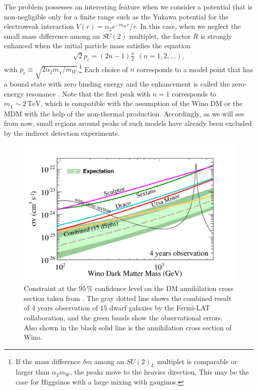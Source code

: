 \documentclass[12pt,twoside,book]{article}
\begin{document}
The problem possesses an interesting feature when we consider a potential that is non-negligible only for a finite range such as the Yukawa potential for the electroweak interaction $V(r) = \alpha_2 e^{-m_W r} / r$.
In this case, when we neglect the small mass difference among an $SU(2)$ multiplet, the factor $R$ is strongly enhanced when the initial particle mass satisfies the equation
\begin{align}
  \sqrt{2} p_c = (2n - 1) \frac{\pi}{2}~~(n = 1, 2, \dots),
\end{align}
with $p_c \equiv \sqrt{2 \alpha_2 m_\chi / m_W}$.\footnote{
  If the mass difference $\delta m$ among an $SU(2)_L$ multiplet is comparable or larger than $\alpha_2 m_W$, the peaks move to the heavier direction.
  This may be the case for Higgsinos with a large mixing with gauginos.
}
Each choice of $n$ corresponds to a model point that has a bound state with zero binding energy and the enhancement is called the zero-energy resonance \cite{Landau1981Quantum}.
Note that the first peak with $n=1$ corresponds to $m_\chi \sim 2\,\mathrm{TeV}$, which is compatible with the assumption of the Wino DM or the MDM with the help of the non-thermal production.
Accordingly, as we will see from now, small regions around peaks of such models have already been excluded by the indirect detection experiments.

\begin{figure}[t]
  \centering
  \includegraphics[width=0.6\hsize]{Present_limit.pdf}
  \caption{
    Constraint at the $95\,\%$ confidence level on the DM annihilation cross section taken from \cite{Bhattacherjee:2014dya}.
    The gray dotted line shows the combined result of $4$ years observation of $15$ dwarf galaxies by the Fermi-LAT collaboration, and the green bands show the observational errors.
    Also shown in the black solid line is the annihilation cross section of Wino.
  }
  \label{fig:indirect_current}
\end{figure}
\end{document}

